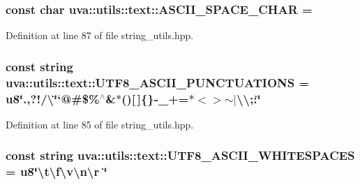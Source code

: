 \subsubsection[{A\+S\+C\+I\+I\+\_\+\+S\+P\+A\+C\+E\+\_\+\+C\+H\+A\+R}]{\setlength{\rightskip}{0pt plus 5cm}const char uva\+::utils\+::text\+::\+A\+S\+C\+I\+I\+\_\+\+S\+P\+A\+C\+E\+\_\+\+C\+H\+A\+R = \textquotesingle{} \textquotesingle{}}\label{namespaceuva_1_1utils_1_1text_aa0a2e61633d27d521157b00734fd5606}


Definition at line 87 of file string\+\_\+utils.\+hpp.

\hypertarget{namespaceuva_1_1utils_1_1text_a7f46a8dbdde9ffc8908e089886ae4190}{}
\subsubsection[{U\+T\+F8\+\_\+\+A\+S\+C\+I\+I\+\_\+\+P\+U\+N\+C\+T\+U\+A\+T\+I\+O\+N\+S}]{\setlength{\rightskip}{0pt plus 5cm}const string uva\+::utils\+::text\+::\+U\+T\+F8\+\_\+\+A\+S\+C\+I\+I\+\_\+\+P\+U\+N\+C\+T\+U\+A\+T\+I\+O\+N\+S = u8\char`\"{}.,?!/\textquotesingle{}\textbackslash{}\char`\"{}`@\#\$\%$^\wedge$\&$\ast$()\mbox{[}$\,$\mbox{]}\{\}-\/\+\_\++=$\ast$$<$$>$$\sim$$\vert$\textbackslash{}\textbackslash{};\+:\char`\"{}}\label{namespaceuva_1_1utils_1_1text_a7f46a8dbdde9ffc8908e089886ae4190}


Definition at line 85 of file string\+\_\+utils.\+hpp.

\hypertarget{namespaceuva_1_1utils_1_1text_a42c8bcfdba70a56d1f7b2332108441e8}{}
\subsubsection[{U\+T\+F8\+\_\+\+A\+S\+C\+I\+I\+\_\+\+W\+H\+I\+T\+E\+S\+P\+A\+C\+E\+S}]{\setlength{\rightskip}{0pt plus 5cm}const string uva\+::utils\+::text\+::\+U\+T\+F8\+\_\+\+A\+S\+C\+I\+I\+\_\+\+W\+H\+I\+T\+E\+S\+P\+A\+C\+E\+S = u8\char`\"{}\textbackslash{}t\textbackslash{}f\textbackslash{}v\textbackslash{}n\textbackslash{}r \char`\"{}}\label{namespaceuva_1_1utils_1_1text_a42c8bcfdba70a56d1f7b2332108441e8}


